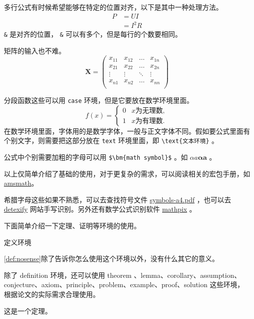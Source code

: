 \documentclass[withoutpreface,bwprint]{cumcmthesis} %
\begin{document}
多行公式有时候希望能够在特定的位置对齐，以下是其中一种处理方法。
\begin{align}
P & = UI \\
& = I^2R
\end{align}
\verb|&| 是对齐的位置， \verb|&| 可以有多个，但是每行的个数要相同。

矩阵的输入也不难。
\[
\mathbf{X} = \left(
    \begin{array}{cccc}
    x_{11} & x_{12} & \ldots & x_{1n}\\
    x_{21} & x_{22} & \ldots & x_{2n}\\
    \vdots & \vdots & \ddots & \vdots\\
    x_{n1} & x_{n2} & \ldots & x_{nn}\\
    \end{array} \right)
\]

分段函数这些可以用 \verb|case| 环境，但是它要放在数学环境里面。
\[
f(x) =
    \begin{cases}
        0 &  x \text{为无理数} ,\\
        1 &  x \text{为有理数} .
    \end{cases}
\]
在数学环境里面，字体用的是数学字体，一般与正文字体不同。假如要公式里面有个别文字，则需要把这部分放在 \verb|text| 环境里面，即 \verb|\text{文本环境}| 。

公式中个别需要加粗的字母可以用 \verb|$\bm{math symbol}$| 。如 $ \alpha a\bm{\alpha a} $ 。

以上仅简单介绍了基础的使用，对于更复杂的需求，可以阅读相关的宏包手册，如 \href{http://texdoc.net/texmf-dist/doc/latex/amsmath/amsldoc.pdf}{amsmath}。

希腊字母这些如果不熟悉，可以去查找符号文件 \href{http://mirrors.ctan.org/info/symbols/comprehensive/symbols-a4.pdf}{symbols-a4.pdf} ，也可以去 \href{http://detexify.kirelabs.org/classify.html}{detexify} 网站手写识别。另外还有数学公式识别软件 \href{https://mathpix.com/}{mathpix} 。

下面简单介绍一下定理、证明等环境的使用。
\begin{definition}
    定义环境
    \label{def:nosense}
\end{definition}
\cref{def:nosense}除了告诉你怎么使用这个环境以外，没有什么其它的意义。

除了 definition 环境，还可以使用 theorem 、lemma、corollary、assumption、conjecture、axiom、principle、problem、example、proof、solution 这些环境，根据论文的实际需求合理使用。


\begin{theorem}
    这是一个定理。
    \label{thm:example}
\end{theorem}
\end{document}
